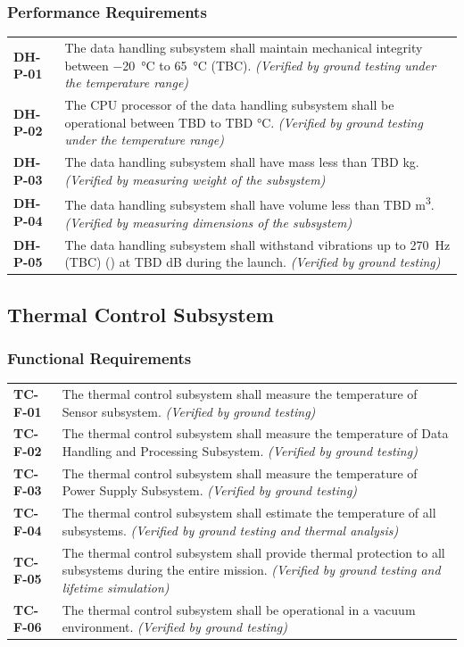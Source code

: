\documentclass[12pt, letterpaper]{article}
\begin{document}
\subsubsection*{Performance Requirements}
\vspace{-20pt}
\begin{longtable}{P{2cm}P{13.75cm}}
\textbf{DH-P-01}	&
The data handling subsystem shall maintain mechanical integrity between \SI{-20}{\degreeCelsius} to \SI{65}{\degreeCelsius} (TBC).
\textit{(Verified by ground testing under the temperature range)}	\\
\textbf{DH-P-02}	&
The CPU processor of the data handling subsystem shall be operational between TBD to TBD \si{\degreeCelsius}.
\textit{(Verified by ground testing under the temperature range)}	\\
\textbf{DH-P-03}	&
The data handling subsystem shall have mass less than TBD \si{\kilo\gram}.
\textit{(Verified by measuring weight of the subsystem)}	\\
\textbf{DH-P-04}	&
The data handling subsystem shall have volume less than TBD \si{\metre\cubed}.
\textit{(Verified by measuring dimensions of the subsystem)}	\\
\textbf{DH-P-05}	&
The data handling subsystem shall withstand vibrations up to \SI{270}{\hertz} (TBC) () at TBD dB during the launch.
\textit{(Verified by ground testing)}
\end{longtable}

\subsection{Thermal Control Subsystem}
\label{sect:thermal}
\subsubsection*{Functional Requirements}
\vspace{-20pt}
\begin{longtable}{P{2cm}P{13.75cm}}
\textbf{TC-F-01}	&
The thermal control subsystem shall measure the temperature of Sensor subsystem.
\textit{(Verified by ground testing)}	\\
\textbf{TC-F-02}	&
The thermal control subsystem shall measure the temperature of Data Handling and Processing Subsystem.
\textit{(Verified by ground testing)}	\\
\textbf{TC-F-03}	&
The thermal control subsystem shall measure the temperature of Power Supply Subsystem.
\textit{(Verified by ground testing)}	\\
\textbf{TC-F-04}	&
The thermal control subsystem shall estimate the temperature of all subsystems. 
\textit{(Verified by ground testing and thermal analysis)}	\\
\textbf{TC-F-05}	&
The thermal control subsystem shall provide thermal protection to all subsystems during the entire mission.
\textit{(Verified by ground testing and lifetime simulation)}	\\
\textbf{TC-F-06}	&
The thermal control subsystem shall be operational in a vacuum environment.
\textit{(Verified by ground testing)}
\end{longtable}
\end{document}
